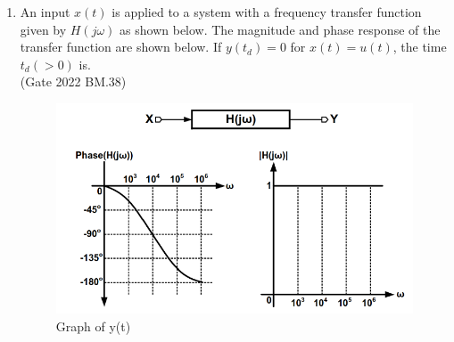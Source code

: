 \begin{enumerate}[label=\thechapter.\arabic*,ref=\thechapter.\theenumi]
\item An input $x(t)$ is applied to a system with a frequency transfer function given by
$H(j\omega)$ as shown below. The magnitude and phase response of the transfer function
are shown below. If $y(t_d) = 0$ for $x(t) = u(t)$, the time $t_d (> 0)$ is.\\ 
\hfill(Gate 2022 BM.38)
\begin{figure}[!h] 
\centering
\includegraphics[width=\columnwidth]{2022/BM/38/figs/given_graph.png}
\caption{Graph of y(t)}
\label{fig:Graph1_gate_BM_38}
\end{figure}
\solution

\newpage


\end{enumerate}
